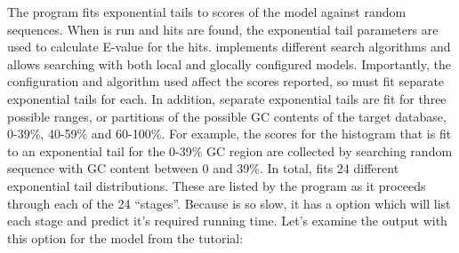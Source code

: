 The  program fits exponential tails to scores of the
model against random sequences. When  is run and hits
are found, the exponential tail parameters are used to calculate
E-value for the hits.  implements different search
algorithms and allows searching with both local and glocally
configured models. Importantly, the configuration and algorithm used
affect the scores reported, so  must fit separate
exponential tails for each.  In addition, separate
exponential tails are fit for three possible ranges, or partitions of
the possible GC contents of the target database, 0-39\%, 40-59\% and
60-100\%.  For example, the scores for the histogram that is fit to an
exponential tail for the 0-39\% GC region are collected by searching
random sequence with GC content between 0 and 39\%. In total,
 fits 24 different exponential tail
distributions. These are listed by the program as it proceeds through
each of the 24 ``stages''.  Because  is so slow, it
has a  option which will list each stage and predict
it's required running time. Let's examine the output with this option
for the  model from the tutorial:


